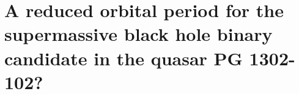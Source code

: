 \chapter[A Reduced Orbital Period for PG 1302-102]{A reduced orbital period for the supermassive black hole binary candidate in the quasar PG 1302-102?}
\label{ch:PG1302_a}
\let\thefootnote\relax{}




%










